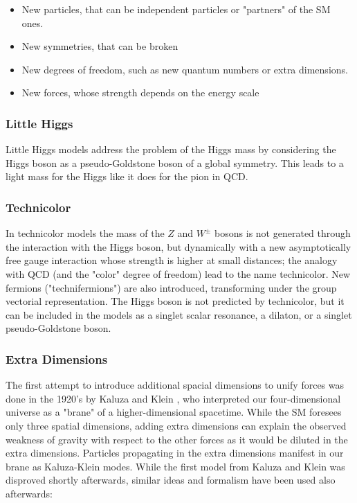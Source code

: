 \begin{itemize}
\item New particles, that can be independent particles or "partners" of the SM ones.
\item New symmetries, that can be broken 
\item New degrees of freedom, such as new quantum numbers or extra dimensions.
\item New forces, whose strength depends on the energy scale
\end{itemize}

\subsubsection*{Little Higgs}
Little Higgs models address the problem of the Higgs mass by considering the Higgs boson as a pseudo-Goldstone boson of a global symmetry. This leads to a light mass for the Higgs like it does for the pion in QCD.

\subsubsection*{Technicolor}
In technicolor models \cite{Weinberg:1975gm}\cite{PhysRevD.20.2619} the mass of the $Z$ and $W^{\pm}$ bosons is not generated through the interaction with the Higgs boson, but dynamically with a new asymptotically free gauge interaction whose strength is higher at small distances; the analogy with QCD (and the "color" degree of freedom) lead to the name technicolor. New fermions ("technifermions") are also introduced, transforming under the group vectorial representation. The Higgs boson is not predicted by technicolor, but it can be included in the models as a singlet scalar resonance, a dilaton, or a singlet pseudo-Goldstone boson.

\subsubsection*{Extra Dimensions}

The first attempt to introduce additional spacial dimensions to unify forces was done in the 1920's by Kaluza and Klein \cite{Kaluza}\cite{Klein:1926tv}, who interpreted our four-dimensional universe as a "brane" of a higher-dimensional spacetime. While the SM foresees only three spatial dimensions, adding extra dimensions can explain the observed weakness of gravity with respect to the other forces as it would be diluted in the extra dimensions. 
Particles propagating in the extra dimensions manifest in our brane as Kaluza-Klein modes. %
While the first model from Kaluza and Klein was disproved shortly afterwards, similar ideas and formalism have been used also afterwards:  

